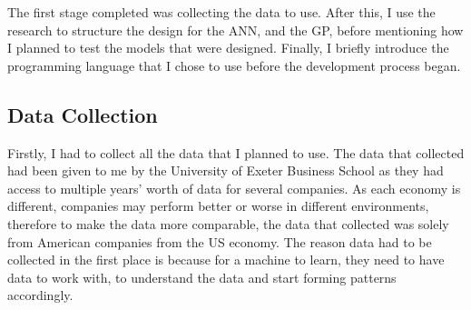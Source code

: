 \documentclass[11pt]{article}
\begin{document}
The first stage completed was collecting the data to use. After this, I use the research to structure the design for the ANN, and the GP, before mentioning how I planned to test the models that were designed. Finally, I briefly introduce the programming language that I chose to use before the development process began.
\subsection{Data Collection}
Firstly, I had to collect all the data that I planned to use. The data that collected had been given to me by the University of Exeter Business School as they had access to multiple years' worth of data for several companies. As each economy is different, companies may perform better or worse in different environments, therefore to make the data more comparable, the data that collected was solely from American companies from the US economy. The reason data had to be collected in the first place is because for a machine to learn, they need to have data to work with, to understand the data and start forming patterns accordingly. 
\end{document}
